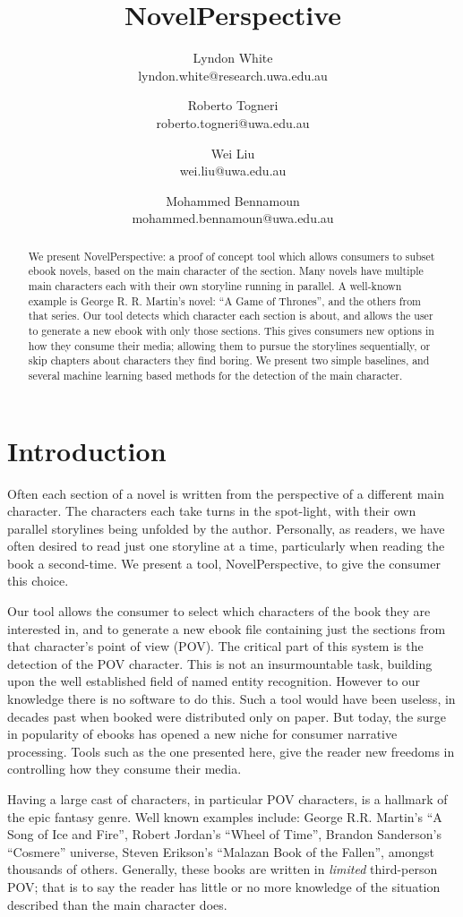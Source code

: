 \documentclass[11pt,a4paper]{article}
\title{NovelPerspective}
\author{Lyndon White \\ lyndon.white@research.uwa.edu.au %
	\and Roberto Togneri \\ roberto.togneri@uwa.edu.au%
	\and Wei Liu \\ wei.liu@uwa.edu.au %
	\and Mohammed Bennamoun \\ mohammed.bennamoun@uwa.edu.au %
}
\begin{document}
\maketitle

\begin{abstract}
We present NovelPerspective: a proof of concept tool which allows consumers to subset ebook novels, based on the main character of the section.
Many novels have multiple main characters each with their own storyline running in parallel.
A well-known example is George R. R. Martin's  novel: ``A Game of Thrones'', and the others from that series.
Our tool detects which character each section is about,
and allows the user to generate a new ebook with only those sections.
This gives consumers new options in how they consume their media; allowing them to  pursue the storylines sequentially, or skip chapters about characters they find boring.
We present two simple baselines, and several machine learning based methods for the detection of the main character.
\end{abstract}

\section{Introduction}
Often each section of a novel is written  from the perspective of a different main character.
The characters each take turns in the spot-light,
with their own parallel storylines being unfolded by the author.
Personally, as readers, we have often desired to read just one storyline at a time, particularly when reading the book a second-time.
We present a tool, NovelPerspective, to give the consumer this choice.

Our tool allows the consumer to select which characters of the book they are interested in,
and to generate a new ebook file containing just the sections from that character's point of view (POV).
The critical part of this system is the detection of the POV character.
This is not an insurmountable task, building upon the well established field of named entity recognition.
However to our knowledge there is no software to do this.
Such a tool would have been useless, in decades past when booked were distributed only on paper.
But today, the surge in popularity of ebooks has opened a new niche for consumer narrative processing.
Tools such as the one presented here, give the reader new freedoms in controlling how they consume their media.

Having a large cast of characters, in particular POV characters, is a hallmark of the epic fantasy genre.
Well known examples include: George R.R. Martin's ``A Song of Ice and Fire'', 
Robert Jordan's ``Wheel of Time'', Brandon Sanderson's ``Cosmere'' universe, 
Steven Erikson's ``Malazan Book of the Fallen'', amongst thousands of others.
Generally, these books are written in \emph{limited} third-person POV;
that is to say the reader has little or no more knowledge of the situation described than the main character does.
\end{document}
